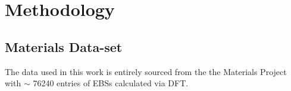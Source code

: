 \documentclass[article]{elsarticle}
\begin{document}
\section{Methodology}

\subsection{Materials Data-set}
The data used in this work is entirely sourced from the the Materials Project with $\sim$ \num{76240} entries of EBSs calculated via DFT. %
\end{document}
